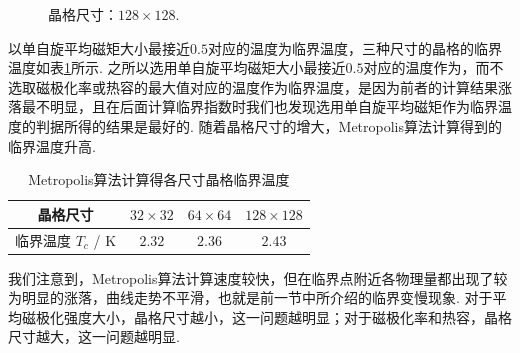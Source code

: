 \documentclass[UTF8,10pt,a4paper]{article}
\theoremstyle{Problem}
\theoremstyle{Solution}
\begin{document}
\begin{figure}[ht]
    \caption{晶格尺寸：$128\times 128$.}
    \label{128-128-Metropolis}
\end{figure}

以单自旋平均磁矩大小最接近$0.5$对应的温度为临界温度，三种尺寸的晶格的临界温度如表\ref{Metropolis-Tc}所示. 之所以选用单自旋平均磁矩大小最接近$0.5$对应的温度作为，而不选取磁极化率或热容的最大值对应的温度作为临界温度，是因为前者的计算结果涨落最不明显，且在后面计算临界指数时我们也发现选用单自旋平均磁矩作为临界温度的判据所得的结果是最好的. 随着晶格尺寸的增大，Metropolis算法计算得到的临界温度升高.

\begin{table}[ht]
    \centering
    \caption{Metropolis算法计算得各尺寸晶格临界温度}
    \label{Metropolis-Tc}
    \begin{tabular}{c|ccc}
    晶格尺寸 & $32\times 32$ & $64\times 64$ & $128\times 128$ \\ \hline
    临界温度 $T_c$ / K & $2.32$ & $2.36$ & $2.43$
    \end{tabular}
\end{table}

我们注意到，Metropolis算法计算速度较快，但在临界点附近各物理量都出现了较为明显的涨落，曲线走势不平滑，也就是前一节中所介绍的临界变慢现象. 对于平均磁极化强度大小，晶格尺寸越小，这一问题越明显；对于磁极化率和热容，晶格尺寸越大，这一问题越明显.
\end{document}
